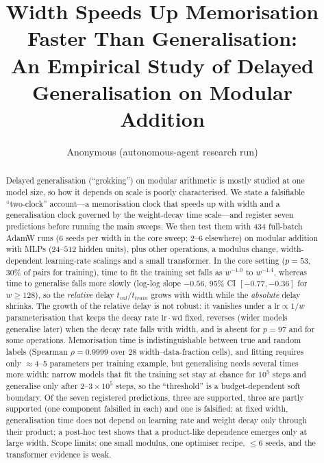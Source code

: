 \documentclass{article}
\title{Width Speeds Up Memorisation Faster Than Generalisation:\\
An Empirical Study of Delayed Generalisation on Modular Addition}
\author{Anonymous (autonomous-agent research run)}
\begin{document}
\maketitle

\begin{abstract}
Delayed generalisation (``grokking'') on modular arithmetic is mostly studied at one model size, so how it depends on scale is
poorly characterised. We state a falsifiable ``two-clock'' account---a memorisation clock that speeds up with width and a generalisation
clock governed by the weight-decay time scale---and register seven predictions before running the main sweeps.
We then test them with 434 full-batch AdamW runs (6 seeds per width in the core sweep; 2--6 elsewhere) on modular addition with
MLPs ($24$--$512$ hidden units), plus other operations, a modulus change, width-dependent learning-rate scalings and a small transformer.
In the core setting ($p{=}53$, 30\% of pairs for training), time to fit the training set falls as $w^{-1.0}$ to $w^{-1.4}$, whereas time to generalise
falls more slowly (log-log slope $-0.56$, 95\% CI $[-0.77,-0.36]$ for $w\ge128$), so the \emph{relative} delay $t_{val}/t_{train}$ grows with
width while the \emph{absolute} delay shrinks. The growth of the relative delay is not robust: it vanishes under a
$\mathrm{lr}\propto 1/w$ parameterisation that keeps the decay rate $\mathrm{lr}\cdot\mathrm{wd}$ fixed, reverses
(wider models generalise later) when the decay rate falls with width, and is absent for $p{=}97$ and for some operations.
Memorisation time is indistinguishable between true and random labels (Spearman $\rho{=}0.9999$ over 28 width--data-fraction cells), and
fitting requires only $\approx$4--5 parameters per training example, but generalising needs several times more width: narrow models that fit the
training set stay at chance for $10^5$ steps and generalise only after $2$--$3\times10^5$ steps, so the ``threshold'' is a budget-dependent
soft boundary. Of the seven registered predictions, three are supported, three are partly supported (one component falsified in each) and one is falsified: at fixed width, generalisation time does not depend on learning rate and weight decay only through their product;
a post-hoc test shows that a product-like dependence emerges only at large width. Scope limits: one small modulus, one optimiser recipe, $\le 6$ seeds, and the transformer evidence is weak.
\end{abstract}
\end{document}
